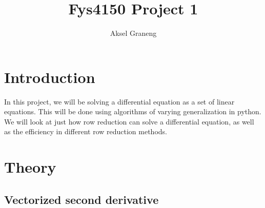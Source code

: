 \documentclass[a4paper,12pt,norsk]{article}
\title{Fys4150 Project 1}
\author{Aksel Graneng}
\begin{document}
\maketitle


\section{Introduction}
	In this project, we will be solving a differential equation as a set of linear equations. This will be done using algorithms of varying generalization in python.\\
	We will look at just how row reduction can solve a differential equation, as well as the efficiency in different row reduction methods.

\section{Theory}

\subsection{Vectorized second derivative}
\end{document}
